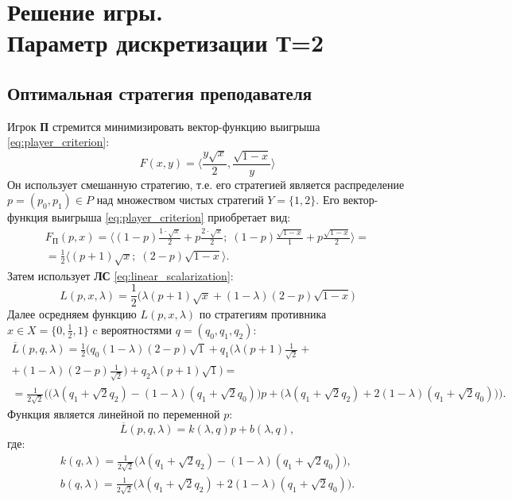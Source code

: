 \section{Решение игры. \\Параметр дискретизации Т=2}

\subsection{Оптимальная стратегия преподавателя}

Игрок \textbf{П} стремится минимизировать вектор-функцию выигрыша  \eqref{eq:player_criterion}: 
$$
	F(x, y) = \Big \langle
		\frac{y\sqrt{x}}{2},\frac{\sqrt{1-x}}{y}
	\Big \rangle
$$	
Он использует смешанную стратегию, т.е. его стратегией является
распределение $p=(p_0,p_1) \in P$ над множеством чистых стратегий $Y=\{1,2\}$.
Его вектор-функция выигрыша \eqref{eq:player_criterion} приобретает вид:
\begin{multline*}
	F_\textrm{П}(p,x)=
	\big \langle 
		(1-p)\frac{1 \cdot \sqrt{x}}{2} + p \frac{2 \cdot \sqrt{x}}{2}; \;
		(1-p)\frac{\sqrt{1-x}}{1}+p\frac{\sqrt{1-x}}{2} 
	\big \rangle= \\
	=\frac{1}{2}
	\big \langle
		(p+1)\sqrt{x}; \;
		(2-p)\sqrt{1-x}
	\big \rangle.
\end{multline*}
Затем использует \textbf{ЛС} \eqref{eq:linear_scalarization}:
$$
	L(p,x,\lambda)=
	\frac{1}{2}
	\big(
		\lambda(p+1)\sqrt{x} + (1-\lambda)(2-p)\sqrt{1-x}
	\big)
$$
Далее осредняем 
функцию $L(p,x,\lambda)$ по стратегиям противника $x \in X=\{0,\frac{1}{2},1\}$ 
c вероятностями $q=(q_0,q_1,q_2)$:
\begin{multline*} 
	\overline{L}(p,q,\lambda)=
	\frac{1}{2} 
	\Big(
		q_0(1-\lambda)(2-p)\sqrt{1}+
		q_1 \big (\lambda(p+1)\frac{1}{\sqrt{2}} + \\
		+(1-\lambda)(2-p)\frac{1}{\sqrt{2}} \big )+
		q_2\lambda(p+1)\sqrt{1}
	\Big)=
	\\
	=\frac{1}{2\sqrt{2}}
	\Big (
		\big (\lambda(q_1+\sqrt{2}q_2)-(1-\lambda)(q_1+\sqrt{2}q_0) \big)p+
		\big (\lambda(q_1+\sqrt{2}q_2)+2(1-\lambda)(q_1+\sqrt{2}q_0) \big)
	\Big).
\end{multline*}
Функция является линейной по переменной $p$:
$$
	\overline{L}(p,q,\lambda)=k(\lambda,q)p+b(\lambda,q),
$$
где:
\begin{gather*}
	k(q, \lambda) = \frac{1}{2\sqrt{2}}
	\big (\lambda(q_1+\sqrt{2}q_2)-(1-\lambda)(q_1+\sqrt{2}q_0) \big)	,
	\\
	b(q, \lambda) = \frac{1}{2\sqrt{2}}
	\big (\lambda(q_1+\sqrt{2}q_2)+2(1-\lambda)(q_1+\sqrt{2}q_0) \big).
\end{gather*}
